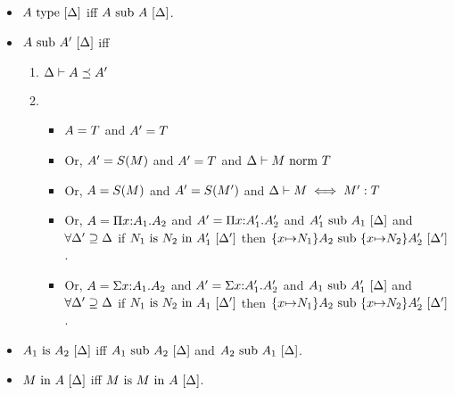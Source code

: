 \documentclass{article}
\theoremstyle{break}
\begin{document}
\begin{itemize}


\item
$\semanticvalidtype{\world}{\kind}$ iff $\semanticsubtype{\world}{\kind}{\kind}$.

\item $\semanticsubtype{\world}{\kind}{\kind'}$ iff
\begin{enumerate}
\item $\subkind{\world}{\kind}{\kind'}$
\item 
\begin{itemize}
\item $\kind = \ktype$ and $\kind' = \ktype$
\item Or, $\kind' = \ksingleton{\constructor}$ and $\kind' = \ktype$ and
$\normterm{\world}{\constructor}{\ktype}$
\item Or, $\kind = \ksingleton{\constructor}$ and $\kind' = \ksingleton{\constructor'}$ and
$\aconequiv{\world}{\constructor}{\constructor'}{\ktype}$
\item Or, $\kind = \kpi{\cvar}{\kind_1}{\kind_2}$ and 
$\kind' = \kpi{\cvar}{\kind'_1}{\kind'_2}$ and 
$\semanticsubtype{\world}{\kind'_1}{\kind_1}$ and
$\forall \world'\supseteq\world$ 
if $\semanticequivterm{\world'}{\otherconstructor_1}{\otherconstructor_2}{\kind'_1}$ then
$\semanticsubtype{\world'}{\substitute{\cvar}{\otherconstructor_1}{\kind_2}}
   {\substitute{\cvar}{\otherconstructor_2}{\kind'_2}}$.
\item Or, $\kind = \ksigma{\cvar}{\kind_1}{\kind_2}$ and 
$\kind' = \ksigma{\cvar}{\kind'_1}{\kind'_2}$ and 
$\semanticsubtype{\world}{\kind_1}{\kind'_1}$ and
$\forall \world'\supseteq\world$ 
if $\semanticequivterm{\world'}{\otherconstructor_1}{\otherconstructor_2}{\kind_1}$ then
$\semanticsubtype{\world'}{\substitute{\cvar}{\otherconstructor_1}{\kind_2}}
   {\substitute{\cvar}{\otherconstructor_2}{\kind'_2}}$.
\end{itemize}
\end{enumerate}

\item $\semanticequivtype{\world}{\kind_1}{\kind_2}$ iff
$\semanticsubtype{\world}{\kind_1}{\kind_2}$ and
$\semanticsubtype{\world}{\kind_2}{\kind_1}$.

\item $\semanticvalidterm{\world}{\constructor}{\kind}$ iff
$\semanticequivterm{\world}{\constructor}{\constructor}{\kind}$.


\end{itemize}
\end{document}
